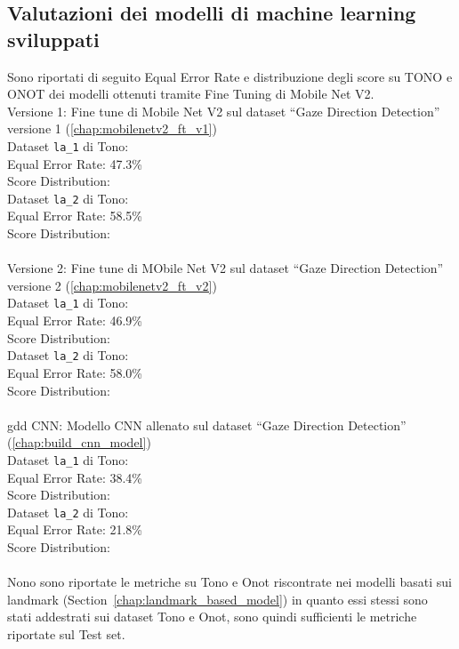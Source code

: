 \documentclass[12pt,a4paper,openright,twoside]{book}
\begin{document}
\subsection{Valutazioni dei modelli di machine learning sviluppati}
Sono riportati di seguito Equal Error Rate e distribuzione degli score su TONO e ONOT dei modelli ottenuti tramite Fine Tuning di Mobile Net V2. \\
Versione 1: Fine tune di Mobile Net V2 sul dataset ``Gaze Direction Detection'' versione 1 (\ref{chap:mobilenetv2_ft_v1}) \\
Dataset \texttt{la\_1} di Tono: \\
Equal Error Rate: 47.3\% \\
Score Distribution:  \\
Dataset \texttt{la\_2} di Tono: \\
Equal Error Rate: 58.5\% \\
Score Distribution:  \\
\\
Versione 2: Fine tune di MObile Net V2 sul dataset ``Gaze Direction Detection'' versione 2 (\ref{chap:mobilenetv2_ft_v2}) \\
Dataset \texttt{la\_1} di Tono: \\
Equal Error Rate: 46.9\% \\
Score Distribution:  \\
Dataset \texttt{la\_2} di Tono: \\
Equal Error Rate: 58.0\% \\
Score Distribution:  \\
\\
gdd CNN: Modello CNN allenato sul dataset ``Gaze Direction Detection'' (\ref{chap:build_cnn_model}) \\
Dataset \texttt{la\_1} di Tono: \\
Equal Error Rate: 38.4\% \\
Score Distribution:  \\
Dataset \texttt{la\_2} di Tono: \\
Equal Error Rate: 21.8\% \\
Score Distribution:  \\
\\
Nono sono riportate le metriche su Tono e Onot riscontrate nei modelli basati sui landmark (Section~\ref{chap:landmark_based_model}) in quanto essi stessi sono stati addestrati sui dataset Tono e Onot, sono quindi sufficienti le metriche riportate sul Test set.
\end{document}
